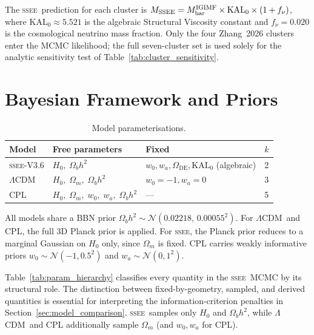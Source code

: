 \documentclass[12pt,a4paper]{article}
\newcommand{\SSEE}{\ifmmode\mathrm{SSEE}\else\textsc{ssee}\fi}
\newcommand{\LCDM}{\ifmmode\Lambda\mathrm{CDM}\else$\Lambda$CDM\fi}
\newcommand{\KALz}{\mathrm{KAL}_0}
\newcommand{\wz}{w_0}
\newcommand{\wa}{w_a}
\newcommand{\OmDE}{\Omega_{\mathrm{DE}}}
\begin{document}
The \SSEE\ prediction for each cluster is
$M_{\rm SSEE}=M_{\rm bar}^{\rm IGIMF}\times\KALz\times(1+f_\nu)$,
where $\KALz\approx5.521$ is the algebraic Structural Viscosity constant
and $f_\nu=0.020$ is the cosmological neutrino mass fraction.
Only the four Zhang~2026 clusters enter the MCMC likelihood;
the full seven-cluster set is used solely for the analytic
sensitivity test of Table~\ref{tab:cluster_sensitivity}.

\section{Bayesian Framework and Priors}
\label{sec:bayes}

\begin{table}[H]
\centering
\caption{Model parameterisations.}
\label{tab:models}
\begin{tabular}{llll}
\toprule
Model & Free parameters & Fixed & $k$ \\
\midrule
\SSEE-V3.6 & $H_0,\;\Omega_b h^2$ & $\wz,\wa,\OmDE,\KALz$ (algebraic) & 2 \\
\LCDM      & $H_0,\;\Omega_m,\;\Omega_b h^2$ & $\wz=-1,\wa=0$ & 3 \\
CPL        & $H_0,\;\Omega_m,\;\wz,\;\wa,\;\Omega_b h^2$ & --- & 5 \\
\bottomrule
\end{tabular}
\end{table}

All models share a BBN prior $\Omega_b h^2\sim\mathcal{N}(0.02218,\,0.00055^2)$.
For \LCDM\ and CPL, the full 3D Planck prior is applied. For \SSEE,
the Planck prior reduces to a marginal Gaussian on $H_0$ only, since
$\Omega_m$ is fixed. CPL carries weakly informative priors
$\wz\sim\mathcal{N}(-1,0.5^2)$ and $\wa\sim\mathcal{N}(0,1^2)$.

Table~\ref{tab:param_hierarchy} classifies every quantity in the \SSEE\
MCMC by its structural role. The distinction between fixed-by-geometry,
sampled, and derived quantities is essential for interpreting the
information-criterion penalties in Section~\ref{sec:model_comparison}.
\SSEE\ samples only $H_0$ and $\Omega_b h^2$, while \LCDM\ and CPL
additionally sample $\Omega_m$ (and $\wz,\wa$ for CPL).
\end{document}
